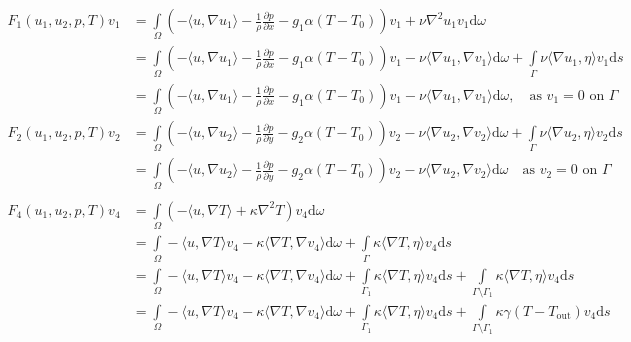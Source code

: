 \documentclass{article}
\begin{document}
 \begin{align*}
 F_1(u_1,u_2,p,T)v_1 &= \int\limits_\Omega \left(-\langle u,\nabla u_1\rangle -\frac{1}{\rho}\frac{\partial p}{\partial x} - g_1\alpha (T-T_0)\right)v_1 + \nu \nabla^2 u_1 v_1 \text{d}\omega \\
 &= \int\limits_\Omega \left(-\langle u,\nabla u_1\rangle -\frac{1}{\rho}\frac{\partial p}{\partial x} - g_1\alpha (T-T_0)\right)v_1 - \nu \langle \nabla u_1,\nabla v_1 \rangle \text{d}\omega + \int\limits_\Gamma \nu \langle \nabla u_1,\eta\rangle v_1 \text{d}s \\
 &= \int\limits_\Omega \left(-\langle u,\nabla u_1\rangle -\frac{1}{\rho}\frac{\partial p}{\partial x} - g_1\alpha (T-T_0)\right)v_1 - \nu \langle \nabla u_1,\nabla v_1 \rangle \text{d}\omega,  \quad \text{as }v_1 = 0 \text{ on } \Gamma \\
 F_2(u_1,u_2,p,T)v_2 &= \int\limits_\Omega \left(-\langle u,\nabla u_2\rangle -\frac{1}{\rho}\frac{\partial p}{\partial y} - g_2\alpha (T-T_0)\right)v_2 - \nu \langle \nabla u_2,\nabla v_2 \rangle \text{d}\omega + \int\limits_\Gamma \nu \langle \nabla u_2,\eta\rangle v_2 \text{d}s\\
 &= \int\limits_\Omega \left(-\langle u,\nabla u_2\rangle -\frac{1}{\rho}\frac{\partial p}{\partial y} - g_2\alpha (T-T_0)\right)v_2 - \nu \langle \nabla u_2,\nabla v_2 \rangle \text{d}\omega \quad \text{as }v_2 = 0 \text{ on } \Gamma \\\\
 F_4(u_1,u_2,p,T)v_4 &=\int\limits_\Omega \left(-\langle u,\nabla T\rangle+ \kappa \nabla^2 T\right)v_4 \text{d}\omega\\
 &=\int\limits_\Omega -\langle u,\nabla T\rangle v_4 - \kappa \langle\nabla T,\nabla v_4\rangle \text{d}\omega + \int\limits_\Gamma \kappa \langle \nabla T,\eta \rangle v_4\text{d}s\\
 &=\int\limits_\Omega -\langle u,\nabla T\rangle v_4 - \kappa \langle\nabla T,\nabla v_4\rangle \text{d}\omega + \int\limits_{\Gamma_1} \kappa \langle \nabla T,\eta \rangle v_4\text{d}s + \int\limits_{\Gamma \setminus \Gamma_1} \kappa \langle \nabla T,\eta \rangle v_4\text{d}s\\
 &=\int\limits_\Omega -\langle u,\nabla T\rangle v_4 - \kappa \langle\nabla T,\nabla v_4\rangle \text{d}\omega + \int\limits_{\Gamma_1} \kappa \langle \nabla T,\eta \rangle v_4\text{d}s + \int\limits_{\Gamma \setminus \Gamma_1} \kappa \gamma(T-T_\text{out}) v_4\text{d}s\\
 \end{align*}
\end{document}

